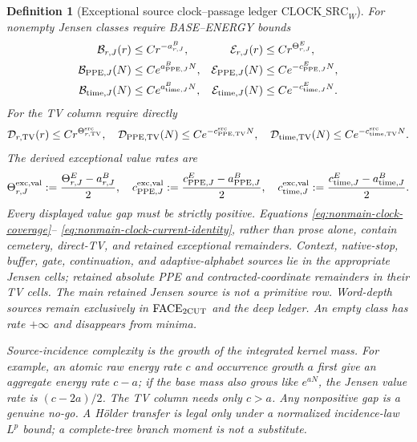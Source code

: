 \documentclass[11pt]{article}
\newtheorem{definition}[theorem]{Definition}
\begin{document}
\begin{definition}[Exceptional source clock--passage ledger
$\mathrm{CLOCK\_SRC}_{W}$]
For nonempty Jensen classes require BASE--ENERGY bounds
\begin{align}
 \mathcal B_{r,J}(r)&\le Cr^{-a_{r,J}^{B}},&
 \mathcal E_{r,J}(r)&\le Cr^{\Theta_{r,J}^{E}},\notag\\
 \mathcal B_{\mathrm{PPE},J}(N)&\le Ce^{a_{\mathrm{PPE},J}^{B}N},&
 \mathcal E_{\mathrm{PPE},J}(N)&\le Ce^{-c_{\mathrm{PPE},J}^{E}N},\notag\\
 \mathcal B_{\mathrm{time},J}(N)&\le Ce^{a_{\mathrm{time},J}^{B}N},&
 \mathcal E_{\mathrm{time},J}(N)&\le Ce^{-c_{\mathrm{time},J}^{E}N}.
 \label{eq:clock-source-matrix-tails}
\end{align}
For the TV column require directly
\begin{equation}
\label{eq:clock-source-TV-tails}
 \mathcal D_{r,\mathrm{TV}}(r)\le Cr^{\Theta_{r,\mathrm{TV}}^{\rm src}},
 \quad
 \mathcal D_{\mathrm{PPE},\mathrm{TV}}(N)
     \le Ce^{-c_{\mathrm{PPE},\mathrm{TV}}^{\rm src}N},
 \quad
 \mathcal D_{\mathrm{time},\mathrm{TV}}(N)
     \le Ce^{-c_{\mathrm{time},\mathrm{TV}}^{\rm src}N}.
\end{equation}
The derived exceptional value rates are
\begin{equation}
\label{eq:exceptional-Jensen-value-rates}
 \Theta_{r,J}^{\rm exc,val}:=
   \frac{\Theta_{r,J}^{E}-a_{r,J}^{B}}2,
 \quad
 c_{\mathrm{PPE},J}^{\rm exc,val}:=
   \frac{c_{\mathrm{PPE},J}^{E}-a_{\mathrm{PPE},J}^{B}}2,
 \quad
 c_{\mathrm{time},J}^{\rm exc,val}:=
   \frac{c_{\mathrm{time},J}^{E}-a_{\mathrm{time},J}^{B}}2.
\end{equation}
Every displayed value gap must be strictly positive.  Equations
\eqref{eq:nonmain-clock-coverage}--
\eqref{eq:nonmain-clock-current-identity}, rather than prose alone, contain
cemetery, direct-TV, and retained exceptional remainders.  Context,
native-stop, buffer, gate, continuation, and adaptive-alphabet sources lie in the
appropriate Jensen cells; retained absolute PPE and contracted-coordinate
remainders in their TV cells.  The main retained Jensen source is not a
primitive row.  Word-depth sources remain exclusively in
$\mathrm{FACE}_{\rm 2CUT}$ and the deep ledger.  An empty class has rate
$+\infty$ and disappears from minima.

Source-incidence complexity is the growth of the integrated kernel mass.
For example, an atomic raw energy rate $c$ and occurrence growth $a$ first
give an aggregate energy rate $c-a$; if the base mass also grows like
$e^{aN}$, the Jensen value rate is $(c-2a)/2$.  The TV column needs only
$c>a$.  Any nonpositive gap is a genuine no-go.  A H\"older transfer is
legal only under a normalized incidence-law $L^p$ bound; a complete-tree
branch moment is not a substitute.
\end{definition}
\end{document}
